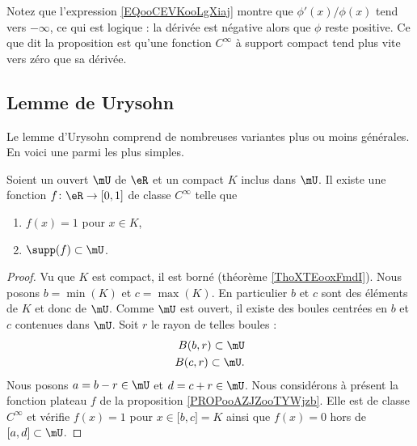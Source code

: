 Notez que l'expression \ref{EQooCEVKooLgXiaj} montre que \( \phi'(x)/\phi(x)\) tend vers \( -\infty\), ce qui est logique : la dérivée est négative alors que \( \phi\) reste positive. Ce que dit la proposition est qu'une fonction \(  C^{\infty}\) à support compact tend plus vite vers zéro que sa dérivée.

\subsection{Lemme de Urysohn}

Le lemme d'Urysohn comprend de nombreuses variantes plus ou moins générales. En voici une parmi les plus simples.
\begin{lemma}      \label{LEMooECTNooKagaRU}
	Soient un ouvert \( \mU\) de \( \eR\) et un compact \( K\) inclus dans \( \mU\). Il existe une fonction \( f\colon \eR\to \mathopen[ 0 , 1 \mathclose]\) de classe  \(  C^{\infty}\) telle que
	\begin{enumerate}
		\item
		      \( f(x)=1\) pour \( x\in K\),
		\item
		      \( \supp(f)\subset \mU\).
	\end{enumerate}
\end{lemma}

\begin{proof}
	Vu que \( K\) est compact, il est borné (théorème \ref{ThoXTEooxFmdI}). Nous posons \( b=\min(K)\) et \( c=\max(K)\). En particulier \( b\) et \( c\) sont des éléments de \( K\) et donc de \( \mU\). Comme \( \mU\) est ouvert, il existe des boules centrées en \( b\) et \( c\) contenues dans \( \mU\). Soit \( r\) le rayon de telles boules :
	\begin{subequations}
		\begin{align}
			B(b,r)\subset \mU \\
			B(c,r)\subset \mU.
		\end{align}
	\end{subequations}
	Nous posons \( a=b-r\in \mU\) et \( d=c+r\in \mU\). Nous considérons à présent la fonction plateau \( f\) de la proposition \ref{PROPooAZJZooTYWjzb}. Elle est de classe \(  C^{\infty}\) et vérifie \( f(x)=1\) pour \( x\in \mathopen[ b , c \mathclose]=K\) ainsi que \( f(x)=0\) hors de \( \mathopen[ a , d \mathclose]\subset \mU\).
\end{proof}

